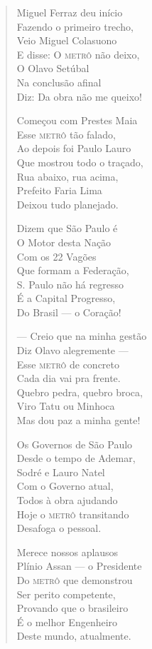 \begin{verse}
Miguel Ferraz deu início \\
Fazendo o primeiro trecho, \\
Veio Miguel Colasuono \\
E disse: O \textsc{metrô} não deixo, \\
O Olavo Setúbal \\
Na conclusão afinal \\
Diz: Da obra não me queixo! 
\pagebreak

Começou com Prestes Maia \\
Esse \textsc{metrô} tão falado, \\
Ao depois foi Paulo Lauro \\
Que mostrou todo o traçado, \\
Rua abaixo, rua acima, \\
Prefeito Faria Lima \\
Deixou tudo planejado. 

Dizem que São Paulo é \\
O Motor desta Nação \\
Com os 22 Vagões \\
Que formam a Federação, \\
S. Paulo não há regresso \\
É a Capital Progresso, \\
Do Brasil ---  o Coração! 

---  Creio que na minha gestão \\
Diz Olavo alegremente --- \\
Esse \textsc{metrô} de concreto \\
Cada dia vai pra frente. \\
Quebro pedra, quebro broca, \\
Viro Tatu ou Minhoca \\
Mas dou paz a minha gente! 

Os Governos de São Paulo \\
Desde o tempo de Ademar, \\
Sodré e Lauro Natel \\
Com o Governo atual, \\
Todos à obra ajudando \\
Hoje o \textsc{metrô} transitando \\
Desafoga o pessoal. 
\pagebreak

Merece nossos aplausos \\
Plínio Assan ---  o Presidente \\
Do \textsc{metrô} que demonstrou \\
Ser perito competente, \\
Provando que o brasileiro \\
É o melhor Engenheiro \\
Deste mundo, atualmente. 


\end{verse}
